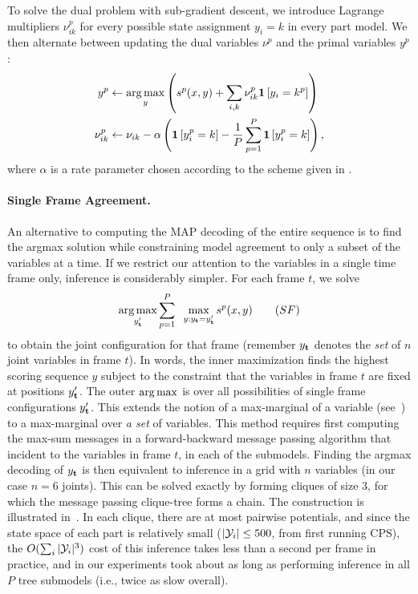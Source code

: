 To solve the dual problem with sub-gradient descent, we introduce
Lagrange multipliers $\nu_{ik}^p$ for every possible state assignment
$y_i = k$ in every part model. We then alternate between updating the
dual variables $\nu^p$ and the primal variables $y^p$:
\begin{align}
  y^p & \leftarrow \mathop{\arg\max}_y \left( s^p(x,y) +  \sum_{i,k} \nu^p_{ik} \mathbf{1}\left[y_i=k^p\right]\right) \\
  \nu^p_{ik} & \leftarrow \nu_{ik} - \alpha\left(  \mathbf{1}\left[y_i^p=k\right] - 
\frac{1}{P}\sum_{p=1}^P \mathbf{1}\left[y_i^p=k\right] \right),
\end{align}
where $\alpha$ is a rate parameter chosen according to the scheme given in 
\citet{komodakis2007}.
 


\paragraph{Single Frame Agreement.} An alternative to computing the
MAP decoding of the entire sequence is to find the argmax solution
while constraining model agreement to only a subset of the variables
at a time.  If we restrict our attention to the variables in a single
time frame only, inference is considerably simpler.  For each frame
$t$, we solve
\begin{equation}
\mathop{\arg\max}_{y_{\bf{t}}'} \sum_{p=1}^P \;\; \max_{y : y_{\bf{t}} = y_{\bf{t}}'} s^p(x,y) \quad{}\quad{(SF)}
\end{equation}
to obtain the joint configuration for that frame (remember $y_{\bf t}$
denotes the {\em set} of $n$ joint variables in frame $t$).  In words,
the inner maximization finds the highest scoring sequence $y$ subject to
the constraint that the variables in frame $t$ are fixed at positions
$y_{\bf t}'$.  The outer $\mathop{\arg\max}$ is over all possibilities of single
frame configurations $y_{\bf t}'$.  This extends the notion of a
max-marginal of a variable (see~) to a max-marginal
over {\em a set} of variables.  This method requires first computing
the max-sum messages in a forward-backward message passing algorithm that 
incident to the variables in frame $t$, in each of the submodels.  Finding the 
argmax decoding of $y_{\bf t}$ is then
equivalent to inference in a grid with $n$ variables (in our case $n=6$
joints).  This can be solved exactly by forming cliques of size 3, for
which the message passing clique-tree forms a chain. The construction is 
illustrated in~.  In each clique,
there are at most pairwise potentials, and since the state space of
each part is relatively small ($|\mathcal{Y}_i| \leq 500$, from first running CPS), the 
$O(\sum_i |\mathcal{Y}_i|^3)$ cost of this inference takes less than a second per frame 
in
practice, and in our experiments took about as long as performing inference in 
all $P$ tree submodels (i.e., twice as slow overall).

